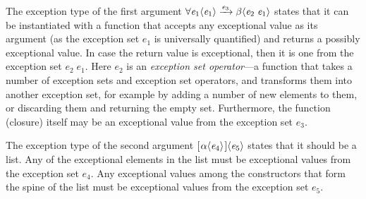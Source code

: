\documentclass{llncs}
\newcommand{\Varid}[1]{\mathit{#1}}
\newcommand\hsforall{\global\let\hsdot=\hsperiodonce}
\newcommand*\hsperiodonce[2]{#2\global\let\hsdot=\hscompose}
\newcommand*\hscompose[2]{#1}
\begin{document}
The exception type of the first argument \ensuremath{\forall \Varid{e}_{\mathrm{1}}\hsforall \hsdot{\circ }{.}\alpha\langle \Varid{e}_{\mathrm{1}} \rangle\xrightarrow{ \Varid{e}_{\mathrm{3}}}\beta\langle \Varid{e}_{\mathrm{2}}\;\Varid{e}_{\mathrm{1}} \rangle} states that it can be instantiated with a function that accepts any exceptional value as its argument (as the exception set \ensuremath{\Varid{e}_{\mathrm{1}}} is universally quantified) and returns a possibly exceptional value. In case the return value is exceptional, then it is one from the exception set \ensuremath{\Varid{e}_{\mathrm{2}}\;\Varid{e}_{\mathrm{1}}}. Here \ensuremath{\Varid{e}_{\mathrm{2}}} is an \emph{exception set operator}---a function that takes a number of exception sets and exception set operators, and transforms them into another exception set, for example by adding a number of new elements to them, or discarding them and returning the empty set. Furthermore, the function (closure) itself may be an exceptional value from the exception set \ensuremath{\Varid{e}_{\mathrm{3}}}.

The exception type of the second argument \ensuremath{[\mskip1.5mu \alpha\langle \Varid{e}_{\mathrm{4}} \rangle\mskip1.5mu]\langle \Varid{e}_{\mathrm{5}} \rangle} states that it should be a list. Any of the exceptional elements in the list must be exceptional values from the exception set \ensuremath{\Varid{e}_{\mathrm{4}}}. Any exceptional values among the constructors that form the spine of the list must be exceptional values from the exception set \ensuremath{\Varid{e}_{\mathrm{5}}}.
\end{document}
